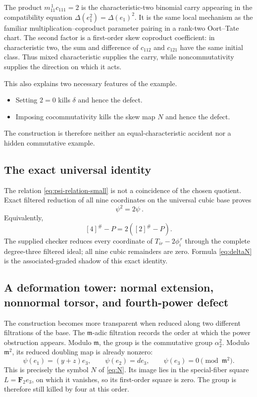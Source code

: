 \documentclass[11pt]{article}
\theoremstyle{remark}
\newcommand{\F}{\mathbf F}
\newcommand{\m}{\mathfrak m}
\begin{document}
The product \(m_{11}^{\,1}c_{111}=2\) is the characteristic-two
binomial carry appearing in the compatibility equation
\(\Delta(e_1^2)=\Delta(e_1)^2\).  It is the same local mechanism as the
familiar multiplication--coproduct parameter pairing in a rank-two
Oort--Tate chart.  The second factor is a first-order skew coproduct
coefficient: in characteristic two, the sum and difference of
\(c_{112}\) and \(c_{121}\) have the same initial class.  Thus mixed
characteristic supplies the carry, while noncommutativity supplies the
direction on which it acts.

This also explains two necessary features of the example.
\begin{itemize}
\item Setting \(2=0\) kills \(\delta\) and hence the defect.
\item Imposing cocommutativity kills the skew map \(N\) and hence the defect.
\end{itemize}
The construction is therefore neither an equal-characteristic accident nor
a hidden commutative example.

\subsection{The exact universal identity}

The relation \eqref{eq:psi-relation-small} is not a coincidence of the
chosen quotient.  Exact filtered reduction of all nine coordinates on the
universal cubic base proves
\begin{equation}\label{eq:universal-psi}
 \boxed{\ \psi^2=2\psi\ }.
\end{equation}
Equivalently,
\[
 [4]^\#-P=2([2]^\#-P).
\]
The supplied checker reduces every coordinate of
\(T_{ir}-2\phi_i^{\,r}\) through the complete degree-three filtered ideal;
all nine cubic remainders are zero.  Formula \eqref{eq:deltaN} is the
associated-graded shadow of this exact identity.

\subsection{A deformation tower: normal extension, nonnormal torsor,
and fourth-power defect}\label{sec:deformation-tower}

The construction becomes more transparent when reduced along two different
filtrations of the base.  The \(\m\)-adic filtration records the order at
which the power obstruction appears.  Modulo \(\m\), the group is the
commutative group \(\alpha_2^2\).  Modulo \(\m^2\), its reduced doubling map
is already nonzero:
\begin{equation}\label{eq:first-order-doubling}
 \psi(e_1)=(y+z)e_3,\qquad
 \psi(e_2)=de_3,\qquad \psi(e_3)=0
 \pmod{\m^2}.
\end{equation}
This is precisely the symbol \(N\) of \eqref{eq:N}.  Its image lies in the
special-fiber square \(L=\F_2e_3\), on which it vanishes, so its first-order
square is zero.  The group is therefore still killed by four at this order.
\end{document}

